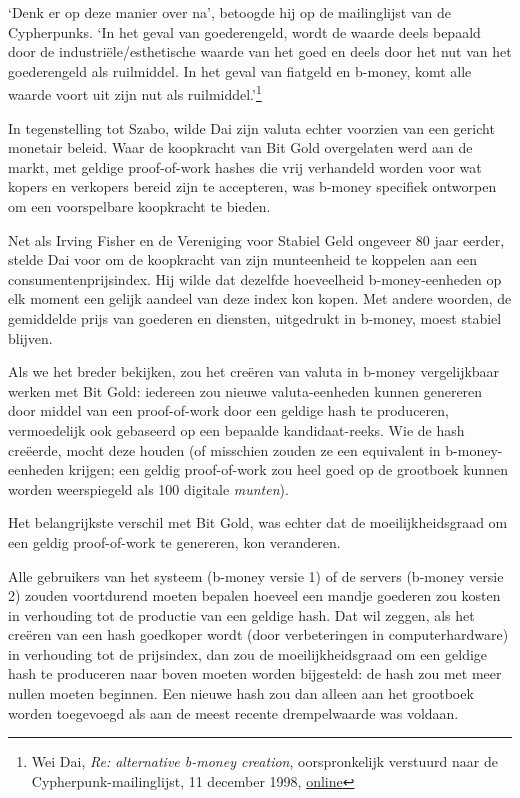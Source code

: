 \documentclass[
  a5paper,
  smalldemyvopaper,11pt,twoside,onecolumn,openright,extrafontsizes,
hidelinks]{memoir}
\begin{document}
`Denk er op deze manier over na', betoogde hij op de mailinglijst van de
Cypherpunks. `In het geval van goederengeld, wordt de waarde deels
bepaald door de industriële/esthetische waarde van het goed en deels
door het nut van het goederengeld als ruilmiddel. In het geval van
fiatgeld en b-money, komt alle waarde voort uit zijn nut als
ruilmiddel.'\footnote{Wei Dai, \emph{Re: alternative b-money creation},
  oorspronkelijk verstuurd naar de Cypherpunk-mailinglijst, 11 december
  1998,
  \href{https://cypherpunks.venona.com/date/1998/12/msg00448.html}{online}}

In tegenstelling tot Szabo, wilde Dai zijn valuta echter voorzien van
een gericht monetair beleid. Waar de koopkracht van Bit Gold overgelaten
werd aan de markt, met geldige proof-of-work hashes die vrij verhandeld
worden voor wat kopers en verkopers bereid zijn te accepteren, was
b-money specifiek ontworpen om een voorspelbare koopkracht te bieden.

Net als Irving Fisher en de Vereniging voor Stabiel Geld ongeveer 80
jaar eerder, stelde Dai voor om de koopkracht van zijn munteenheid te
koppelen aan een consumentenprijsindex. Hij wilde dat dezelfde
hoeveelheid b-money-eenheden op elk moment een gelijk aandeel van deze
index kon kopen. Met andere woorden, de gemiddelde prijs van goederen en
diensten, uitgedrukt in b-money, moest stabiel blijven.

Als we het breder bekijken, zou het creëren van valuta in b-money
vergelijkbaar werken met Bit Gold: iedereen zou nieuwe valuta-eenheden
kunnen genereren door middel van een proof-of-work door een geldige hash
te produceren, vermoedelijk ook gebaseerd op een bepaalde
kandidaat-reeks. Wie de hash creëerde, mocht deze houden (of misschien
zouden ze een equivalent in b-money-eenheden krijgen; een geldig
proof-of-work zou heel goed op de grootboek kunnen worden weerspiegeld
als 100 digitale \emph{munten}).

Het belangrijkste verschil met Bit Gold, was echter dat de
moeilijkheidsgraad om een geldig proof-of-work te genereren, kon
veranderen.

Alle gebruikers van het systeem (b-money versie 1) of de servers
(b-money versie 2) zouden voortdurend moeten bepalen hoeveel een mandje
goederen zou kosten in verhouding tot de productie van een geldige hash.
Dat wil zeggen, als het creëren van een hash goedkoper wordt (door
verbeteringen in computerhardware) in verhouding tot de prijsindex, dan
zou de moeilijkheidsgraad om een geldige hash te produceren naar boven
moeten worden bijgesteld: de hash zou met meer nullen moeten beginnen.
Een nieuwe hash zou dan alleen aan het grootboek worden toegevoegd als
aan de meest recente drempelwaarde was voldaan.
\end{document}
